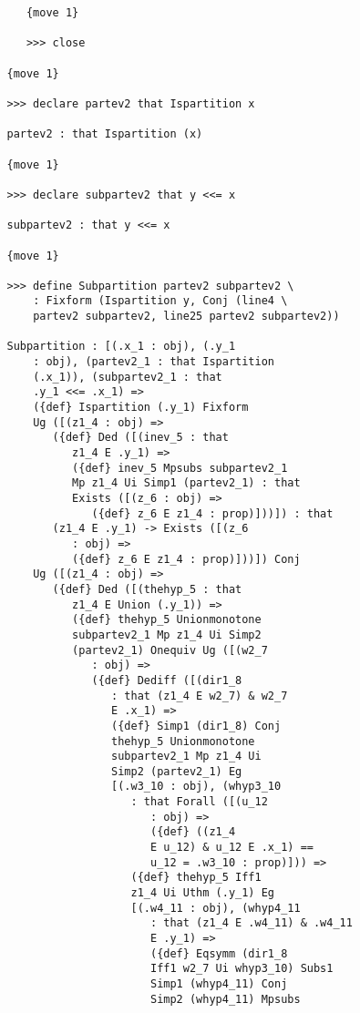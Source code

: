 \documentclass[12pt]{article}
\begin{document}
\begin{verbatim}
      {move 1}

      >>> close

   {move 1}

   >>> declare partev2 that Ispartition x

   partev2 : that Ispartition (x)

   {move 1}

   >>> declare subpartev2 that y <<= x

   subpartev2 : that y <<= x

   {move 1}

   >>> define Subpartition partev2 subpartev2 \
       : Fixform (Ispartition y, Conj (line4 \
       partev2 subpartev2, line25 partev2 subpartev2))

   Subpartition : [(.x_1 : obj), (.y_1 
       : obj), (partev2_1 : that Ispartition 
       (.x_1)), (subpartev2_1 : that 
       .y_1 <<= .x_1) => 
       ({def} Ispartition (.y_1) Fixform 
       Ug ([(z1_4 : obj) => 
          ({def} Ded ([(inev_5 : that 
             z1_4 E .y_1) => 
             ({def} inev_5 Mpsubs subpartev2_1 
             Mp z1_4 Ui Simp1 (partev2_1) : that 
             Exists ([(z_6 : obj) => 
                ({def} z_6 E z1_4 : prop)]))]) : that 
          (z1_4 E .y_1) -> Exists ([(z_6 
             : obj) => 
             ({def} z_6 E z1_4 : prop)]))]) Conj 
       Ug ([(z1_4 : obj) => 
          ({def} Ded ([(thehyp_5 : that 
             z1_4 E Union (.y_1)) => 
             ({def} thehyp_5 Unionmonotone 
             subpartev2_1 Mp z1_4 Ui Simp2 
             (partev2_1) Onequiv Ug ([(w2_7 
                : obj) => 
                ({def} Dediff ([(dir1_8 
                   : that (z1_4 E w2_7) & w2_7 
                   E .x_1) => 
                   ({def} Simp1 (dir1_8) Conj 
                   thehyp_5 Unionmonotone 
                   subpartev2_1 Mp z1_4 Ui 
                   Simp2 (partev2_1) Eg 
                   [(.w3_10 : obj), (whyp3_10 
                      : that Forall ([(u_12 
                         : obj) => 
                         ({def} ((z1_4 
                         E u_12) & u_12 E .x_1) == 
                         u_12 = .w3_10 : prop)])) => 
                      ({def} thehyp_5 Iff1 
                      z1_4 Ui Uthm (.y_1) Eg 
                      [(.w4_11 : obj), (whyp4_11 
                         : that (z1_4 E .w4_11) & .w4_11 
                         E .y_1) => 
                         ({def} Eqsymm (dir1_8 
                         Iff1 w2_7 Ui whyp3_10) Subs1 
                         Simp1 (whyp4_11) Conj 
                         Simp2 (whyp4_11) Mpsubs 

\end{verbatim}
\end{document}
